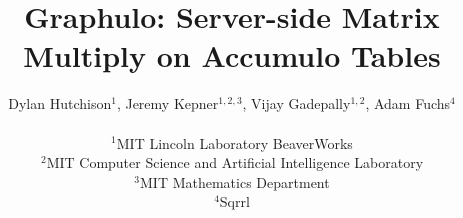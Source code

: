 \documentclass[conference]{IEEEtran}
\begin{document}
\title{Graphulo: Server-side Matrix Multiply on Accumulo Tables}



\author[D. Hutchison et al.]
       {Dylan Hutchison$^1$, Jeremy Kepner$^{1,2,3}$, Vijay Gadepally$^{1,2}$, Adam Fuchs$^4$\\
         \\
         $^1$MIT Lincoln Laboratory BeaverWorks\\
         $^2$MIT Computer Science and Artificial Intelligence Laboratory\\
         $^3$MIT Mathematics Department\\
         $^4$Sqrrl\\
       }


%

\maketitle
\end{document}
